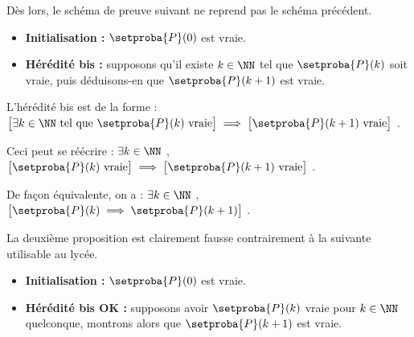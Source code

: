 \documentclass[12pt]{amsart}
\begin{document}
\bigskip

Dès lors, le schéma de preuve suivant ne reprend pas le schéma précédent.
	
	\begin{itemize}[label=\small\textbullet]
		\item \textbf{Initialisation :}
		      $\setproba{P}(0)$ est vraie.

		\item \textbf{Hérédité bis :}
		      supposons qu'il existe $k \in \NN$ tel que $\setproba{P}(k)$ soit vraie, puis déduisons-en que $\setproba{P}(k+1)$ est vraie.
	\end{itemize}

L'hérédité bis est de la forme :
$\big[ \exists k \in \NN \text{ tel que } \setproba{P}(k) \text{ vraie} \big] \implies \big[ \setproba{P}(k+1) \text{ vraie} \big]$ .

Ceci peut se réécrire :
$\exists k \in \NN$ , $\big[ \setproba{P}(k) \text{ vraie} \big] \implies \big[ \setproba{P}(k+1) \text{ vraie} \big]$ .

De façon équivalente, on a :
$\exists k \in \NN$ , $\big[ \setproba{P}(k) \implies \setproba{P}(k+1) \big]$ . 

\medskip

La deuxième proposition est clairement fausse contrairement à la suivante utilisable au lycée.
	
	\begin{itemize}[label=\small\textbullet]
		\item \textbf{Initialisation :}
		      $\setproba{P}(0)$ est vraie.

		\item \textbf{Hérédité bis OK :}
		      supposons avoir $\setproba{P}(k)$ vraie pour $k \in \NN$ quelconque, montrons alors que $\setproba{P}(k+1)$ est vraie.
	\end{itemize}
\end{document}
